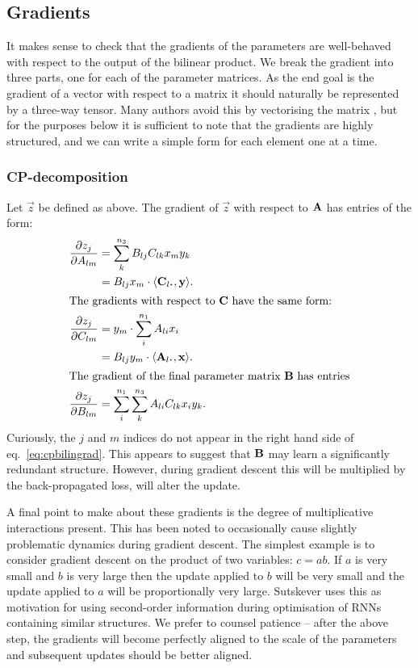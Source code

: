 \subsection{Gradients}
It makes sense to check that the gradients of the parameters are well-behaved
with respect to the output of the bilinear product. We break the gradient into three parts,
one for each of the parameter matrices. As the end goal is the gradient of a vector with respect
to a matrix it should naturally be represented by a three-way tensor. Many authors avoid this by
vectorising the matrix \autocite{Magnus2007}, but for the purposes below it is sufficient to note
that the gradients are highly structured, and we can write a simple form for each element one at a
time.

\subsubsection{CP-decomposition}

Let \(\vec{z}\) be defined as above.
The gradient of \(\vec{z}\) with respect to \(\mathbf{A}\) has entries of the form:
\begin{align}
	\frac{\partial z_j}{\partial A_{lm}} &= \sum_k^{n_3}B_{lj}C_{lk}x_my_k \\
		&= B_{lj}x_m \cdot \langle\vec{C}_{l\midbullet}, \vec{y}\rangle.\\
\intertext{The gradients with respect to \(\mat{C}\) have the same form:}
	\frac{\partial z_j}{\partial C_{lm}} &= y_m \cdot \sum_i^{n_1}A_{li}x_i \\
		&= B_{lj}y_m \cdot \langle\vec{A}_{l\midbullet}, \vec{x}\rangle.\\
\intertext{The gradient of the final parameter matrix \(\mat{B}\) has entries}
	\frac{\partial z_j}{\partial B_{lm}} &= 
		\sum_i^{n_1}\sum_k^{n_3}A_{li}C_{lk}x_iy_k. \label{eq:cpbilingrad}
\end{align}
Curiously, the \(j\) and \(m\) indices do not appear in the right hand side of 
eq.~\eqref{eq:cpbilingrad}. This appears to suggest that \(\mathbf{B}\) may learn a significantly
redundant structure. However, during gradient descent this will be multiplied by the back-propagated
loss, will alter the update.

A final point to make about these gradients is the degree of multiplicative interactions present.
This has been noted to occasionally cause slightly problematic dynamics during gradient descent. The
simplest example is to consider
gradient descent on the product of two variables: \(c = ab\). If \(a\) is very small and \(b\) is
very large then the update applied to \(b\) will be very small and the update applied to \(a\) will
be proportionally very large. Sutskever \autocite{Sutskever2013} uses this as motivation for using
second-order information during optimisation of RNNs containing similar structures. We prefer to
counsel patience -- after the above step, the gradients will become perfectly aligned to the scale
of the parameters and subsequent updates should be better aligned.



